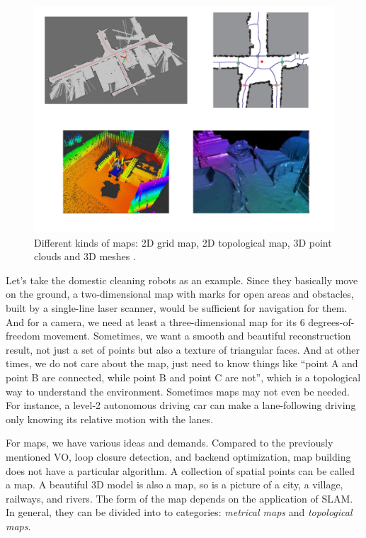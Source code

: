\begin{figure}
	\centering
	\includegraphics[width=1.0\textwidth]{./resources/whatIsSLAM/map.pdf}
	\caption{Different kinds of maps: 2D grid map, 2D topological map, 3D point clouds and 3D meshes \cite{Beeson2010}.}
	\label{fig:mapping}
\end{figure}

Let's take the domestic cleaning robots as an example. Since they basically move on the ground, a two-dimensional map with marks for open areas and obstacles, built by a single-line laser scanner, would be sufficient for navigation for them. And for a camera, we need at least a three-dimensional map for its 6 degrees-of-freedom movement. Sometimes, we want a smooth and beautiful reconstruction result, not just a set of points but also a texture of triangular faces. And at other times, we do not care about the map, just need to know things like ``point A and point B are connected, while point B and point C are not'', which is a topological way to understand the environment. Sometimes maps may not even be needed. For instance, a level-2 autonomous driving car can make a lane-following driving only knowing its relative motion with the lanes.

For maps, we have various ideas and demands. Compared to the previously mentioned VO, loop closure detection, and backend optimization, map building does not have a particular algorithm. A collection of spatial points can be called a map. A beautiful 3D model is also a map, so is a picture of a city, a village, railways, and rivers. The form of the map depends on the application of SLAM. In general, they can be divided into to categories: \emph{metrical maps} and \emph{topological maps}.


